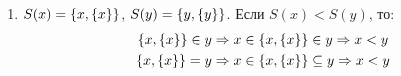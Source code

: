 \begin{solution}
\begin{enumerate}
	\item $S(x) = \xbrace{x, \xbrace{x}}$, $S(y) = \xbrace{y, \xbrace{y}}$. Если $S(x) < S(y)$, то:
	\begin{align*}
		\xbrace{x, \xbrace{x}} \in y & \Rightarrow x \in \xbrace{x, \xbrace{x}} \in y \Rightarrow x < y \\
		\xbrace{x, \xbrace{x}} = y & \Rightarrow x \in \xbrace{x, \xbrace{x}} \subseteq y \Rightarrow x < y
	\end{align*}
\end{enumerate}
\end{solution}


